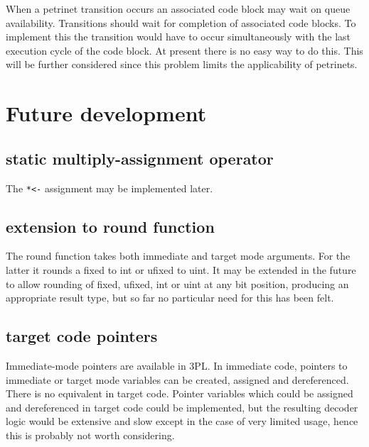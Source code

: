             When a petrinet transition occurs an associated code block may wait
            on queue availability. Transitions should wait for completion of
            associated code blocks. To implement this the transition would have
            to occur simultaneously with the last execution cycle of the code
            block. At present there is no easy way to do this. This will be
            further considered since this problem limits the applicability of
            petrinets.






    \section{Future development}

        \subsection{static multiply-assignment operator}

            The \verb'*<-' assignment may be implemented later.

        \subsection{extension to round function}

            The round function takes both immediate and target mode arguments.
            For the latter it rounds a fixed to int or ufixed to uint. It may
            be extended in the future to allow rounding of fixed, ufixed, int
            or uint at any bit position, producing an appropriate result type,
            but so far no particular need for this has been felt.

        \subsection{target code pointers}

            Immediate-mode pointers are available in 3PL. In immediate code,
            pointers to immediate or target mode variables can be created,
            assigned and dereferenced. There is no equivalent in target code.
            Pointer variables which could be assigned and dereferenced in target
            code could be implemented, but the resulting decoder logic would be
            extensive and slow except in the case of very limited usage, hence
            this is probably not worth considering.

